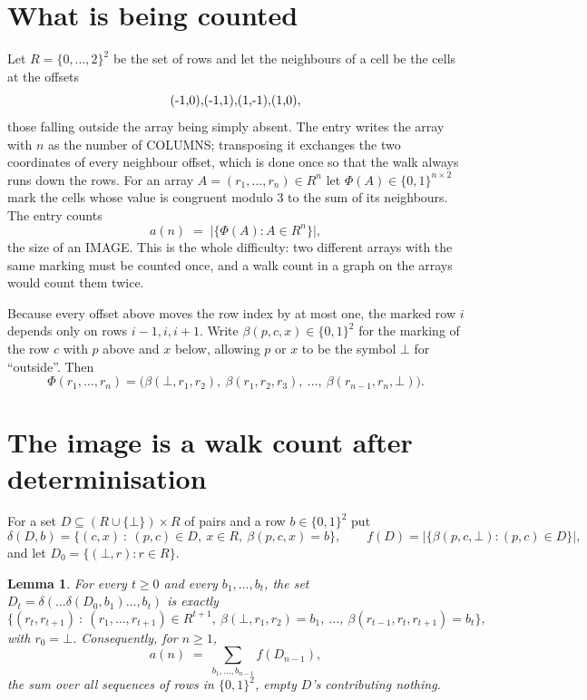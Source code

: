 \documentclass[11pt,a4paper]{article}
\theoremstyle{plain}
\newtheorem{lemma}[theorem]{Lemma}
\theoremstyle{definition}
\begin{document}
\section{What is being counted}

Let $R=\{0,\dots,2\}^{2}$ be the set of rows and let the neighbours of a cell be the
cells at the offsets
\[
$(-1,0)$, $(-1,1)$, $(1,-1)$, $(1,0)$,
\]
those falling outside the array being simply absent. The entry writes the array with $n$ as the number of COLUMNS; transposing it exchanges the two coordinates of every neighbour offset, which is done once so that the walk always runs down the rows. For an array
$A=(r_1,\dots,r_n)\in R^n$ let $\Phi(A)\in\{0,1\}^{n\times2}$ mark the cells whose value
is congruent modulo 3 to the sum of its neighbours. The entry counts
\[
a(n)\;=\;\bigl|\{\Phi(A):A\in R^n\}\bigr| ,
\]
the size of an IMAGE. This is the whole difficulty: two different arrays with the same marking
must be counted once, and a walk count in a graph on the arrays would count them twice.

Because every offset above moves the row index by at most one, the marked row $i$ depends only
on rows $i-1,i,i+1$. Write $\beta(p,c,x)\in\{0,1\}^{2}$ for the marking of the row $c$
with $p$ above and $x$ below, allowing $p$ or $x$ to be the symbol $\bot$ for ``outside''.
Then
\[
\Phi(r_1,\dots,r_n)=\bigl(\beta(\bot,r_1,r_2),\ \beta(r_1,r_2,r_3),\ \dots,\
\beta(r_{n-1},r_n,\bot)\bigr).
\]

\section{The image is a walk count after determinisation}

For a set $D\subseteq(R\cup\{\bot\})\times R$ of pairs and a row $b\in\{0,1\}^{2}$ put
\[
\delta(D,b)=\{(c,x)\ :\ (p,c)\in D,\ x\in R,\ \beta(p,c,x)=b\},\qquad
f(D)=\bigl|\{\beta(p,c,\bot):(p,c)\in D\}\bigr| ,
\]
and let $D_0=\{(\bot,r):r\in R\}$.

\begin{lemma}\label{lem:det}
For every $t\ge0$ and every $b_1,\dots,b_t$, the set
$D_t=\delta(\dots\delta(D_0,b_1)\dots,b_t)$ is exactly
\[
\{(r_t,r_{t+1})\ :\ (r_1,\dots,r_{t+1})\in R^{t+1},\ \beta(\bot,r_1,r_2)=b_1,\ \dots,\
\beta(r_{t-1},r_t,r_{t+1})=b_t\} ,
\]
with $r_0=\bot$. Consequently, for $n\ge1$,
\[
a(n)\;=\;\sum_{b_1,\dots,b_{n-1}}f(D_{n-1}),
\]
the sum over all sequences of rows in $\{0,1\}^{2}$, empty $D$'s contributing nothing.
\end{lemma}
\end{document}

